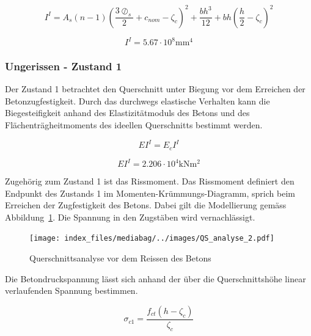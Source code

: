 \documentclass[
  12pt,
  letterpaper,
  egregdoesnotlikesansseriftitles]{scrreprt}
\begin{document}
\begin{equation}I^{I} = A_{s} \left(n - 1\right) \left(\frac{3 \oslash_{s}}{2} + c_{nom} - \zeta_{c}\right)^{2} + \frac{b h^{3}}{12} + b h \left(\frac{h}{2} - \zeta_{c}\right)^{2}\end{equation}

\begin{equation}I^{I} = 5.67 \cdot 10^{8} \text{mm}^{4}\end{equation}

\hypertarget{ungerissen---zustand-1}{%
\subsubsection{Ungerissen - Zustand 1}\label{ungerissen---zustand-1}}

Der Zustand 1 betrachtet den Querschnitt unter Biegung vor dem Erreichen
der Betonzugfestigkeit. Durch das durchwegs elastische Verhalten kann
die Biegesteifigkeit anhand des Elastizitätmoduls des Betons und des
Flächenträgheitmoments des ideellen Querschnitts bestimmt werden.

\begin{equation}EI^{I} = E_{c} I^{I}\end{equation}

\begin{equation}EI^{I} = 2.206 \cdot 10^{4} \text{kN} \text{m}^{2}\end{equation}

Zugehörig zum Zustand 1 ist das Rissmoment. Das Rissmoment definiert den
Endpunkt des Zustands 1 im Momenten-Krümmungs-Diagramm, sprich beim
Erreichen der Zugfestigkeit des Betons. Dabei gilt die Modellierung
gemäss Abbildung~\ref{fig-qs2}. Die Spannung in den Zugstäben wird
vernachlässigt.

\begin{figure}[H]

{\centering \texttt{[image: index\_files/mediabag/../images/QS\_analyse\_2.pdf]}

}

\caption{\label{fig-qs2}Querschnittsanalyse vor dem Reissen des Betons}

\end{figure}

Die Betondruckspannung lässt sich anhand der über die Querschnittshöhe
linear verlaufenden Spannung bestimmen.

\begin{equation}\sigma_{c 1} = \frac{f_{ct} \left(h - \zeta_{c}\right)}{\zeta_{c}}\end{equation}
\end{document}
